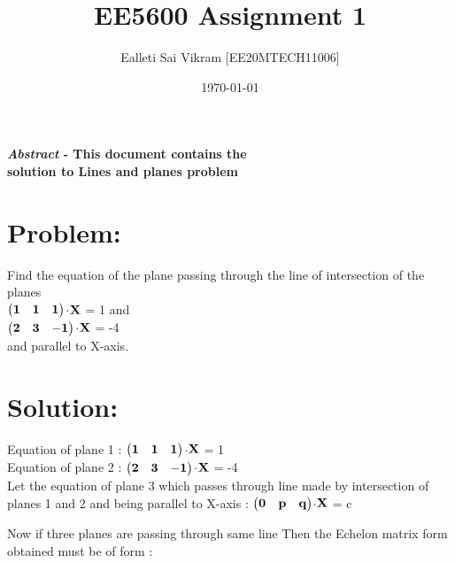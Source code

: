 \documentclass[twocolumn]{article}
\let\vec\mathbf
\begin{document}
\title{EE5600 Assignment 1}
\author{Ealleti Sai Vikram [EE20MTECH11006]}
\date{\today}
\maketitle



\textbf{\emph{Abstract} - This document contains the \\solution to Lines and planes problem}



\section*{Problem:}
Find the equation of the plane passing through
the line of intersection of the planes
\\   
\hspace*{2cm}  
$\begin{pmatrix}{\bf1}&{\bf1}&{\bf1}\end{pmatrix}$$\cdot$${\bf \vec{X}}$ = 1  and
\\
\hspace*{1.9cm}
$\begin{pmatrix}{\bf2}&{\bf 3}&{\bf -1}\end{pmatrix}$$\cdot$${\bf \vec{X}}$ = -4
\\
and parallel to X-axis.

\section*{Solution:}
Equation of plane 1 : $\begin{pmatrix}{\bf1}&{\bf1}&{\bf1}\end{pmatrix}$$\cdot$${\bf \vec{X}}$ = 1  
\\Equation of plane 2 :
$\begin{pmatrix}{\bf2}&{\bf 3}&{\bf -1}\end{pmatrix}$$\cdot$${\bf \vec{X}}$ = -4
\\Let the equation of plane 3 which passes through line made by intersection of planes 1 and 2 and being parallel to X-axis : $\begin{pmatrix}{\bf0}&{\bf p}&{\bf q}\end{pmatrix}$$\cdot$${\bf \vec{X}}$ = c

Now if three planes are passing through same line Then the Echelon matrix form obtained must be of form :
\end{document}

